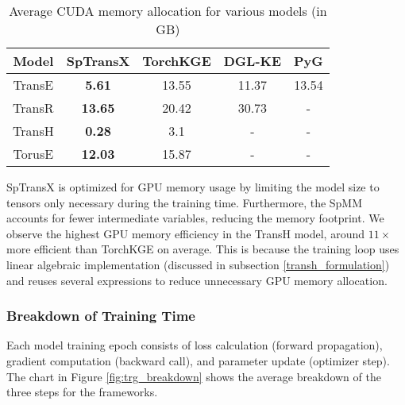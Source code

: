     \begin{table}[h]
    \caption{Average CUDA memory allocation for various models (in GB)}
    \label{table:cuda-mem-allocation}
    \vskip 0.15in
    \begin{center}
    \begin{small}
    \begin{sc}
    \begin{tabular}{ccccc}
    \toprule
    Model  & SpTransX       & TorchKGE & DGL-KE & PyG   \\
    \midrule
    TransE & \textbf{5.61}  & 13.55    & 11.37  & 13.54 \\
    TransR & \textbf{13.65} & 20.42    & 30.73  & -     \\
    TransH & \textbf{0.28}  & 3.1      & -      & -     \\
    TorusE & \textbf{12.03} & 15.87    & -      & -                   \\                        
    \bottomrule
    \end{tabular}
    \end{sc}
    \end{small}
    \end{center}
    \vskip -0.1in
    \end{table}

    SpTransX is optimized for GPU memory usage by limiting the model size to tensors only necessary during the training time. Furthermore, the SpMM accounts for fewer intermediate variables, reducing the memory footprint. We observe the highest GPU memory efficiency in the TransH model, around $11\times$ more efficient than TorchKGE on average. This is because the training loop uses linear algebraic implementation (discussed in subsection \ref{transh_formulation}) and reuses several expressions to reduce unnecessary GPU memory allocation.

\subsubsection{Breakdown of Training Time}
Each model training epoch consists of loss calculation (forward propagation), gradient computation (backward call), and parameter update (optimizer step). The chart in Figure \ref{fig:trg_breakdown} shows the average breakdown of the three steps for the frameworks.

\begin{figure*}[h]
\centering     %
{}
\hspace{5pt}
\caption{Breakdown of total training time for CPU and GPU on average of 7 datasets}
\label{fig:trg_breakdown}
\end{figure*}

